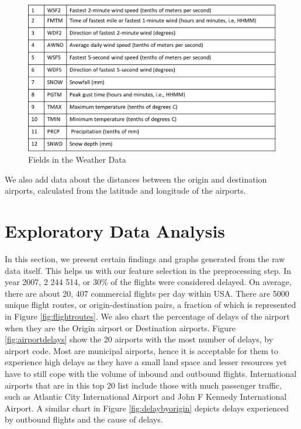 \documentclass[letterpaper,11pt]{article}
\begin{document}
\begin{figure}[htb]
\centering
\includegraphics[height=0.6\linewidth]{weatherdata.png}
\caption{Fields in the Weather Data}
\label{fig:weatherdata}
\end{figure}

We also add data about the distances between the origin and destination airports, calculated from the latitude and longitude of the airports. 

\section{Exploratory Data Analysis}
In this section, we present certain findings and graphs generated from the raw data itself. This helps us with our feature selection in the preprocessing step. In year 2007, 2 244 514, or 30\% of the flights were considered delayed. On average, there are about 20, 407 commercial flights per day within USA. There are 5000 unique flight routes, or origin-destination pairs, a fraction of which is represented in Figure \ref{fig:flightroutes}. We also chart the percentage of delays of the airport when they are the Origin airport or Destination airports. Figure \ref{fig:airportdelays} show the 20 airports with the most number of delays, by airport code. Most are municipal airports, hence it is acceptable for them to experience high delays as they have a small land space and lesser resources yet have to still cope with the volume of inbound and outbound flights. International airports that are in this top 20 list include those with much passenger traffic, such as Atlantic City International Airport and John F Kennedy International Airport. A similar chart in Figure \ref{fig:delaybyorigin} depicts delays experienced by outbound flights and the cause of delays. 
\end{document}
